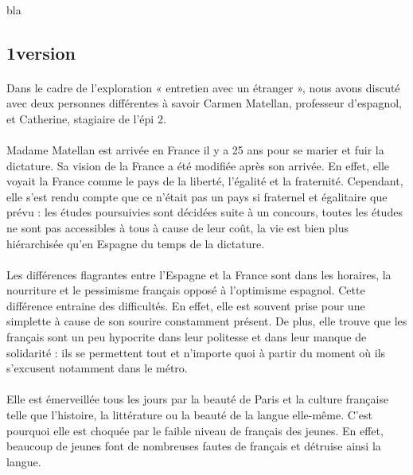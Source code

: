 \paragraph{}
bla

\subsection{1\ier version}
\paragraph{}
Dans le cadre de l’exploration « entretien avec un étranger », nous avons discuté avec deux personnes différentes à savoir Carmen Matellan, professeur d’espagnol, et Catherine, stagiaire de l’épi 2.
\paragraph{}
Madame Matellan est arrivée en France il y a 25 ans pour se marier et fuir la dictature. Sa vision de la France a été modifiée après son arrivée. En effet, elle voyait la France comme le pays de la liberté, l’égalité et la fraternité. Cependant, elle s’est rendu compte que ce n’était pas un pays si fraternel et égalitaire que prévu : les études poursuivies sont décidées suite à un concours, toutes les études ne sont pas accessibles à tous à cause de leur coût, la vie est bien plus hiérarchisée qu’en Espagne du temps de la dictature. 
\paragraph{}
Les différences flagrantes entre l’Espagne et la France sont dans les horaires, la nourriture et le pessimisme français opposé à l’optimisme espagnol. Cette différence entraine des difficultés. En effet, elle est souvent prise pour une simplette à cause de son sourire constamment présent. De plus, elle trouve que les français sont un peu hypocrite dans leur politesse et dans leur manque de solidarité : ils se permettent tout et n’importe quoi à partir du moment où ils s’excusent notamment dans le métro.
\paragraph{}
Elle est émerveillée tous les jours par la beauté de Paris et la culture française telle que l’histoire, la littérature ou la beauté de la langue elle-même. C’est pourquoi elle est choquée par le faible niveau de français des jeunes. En effet, beaucoup de jeunes font de nombreuses fautes de français et détruise ainsi la langue.
